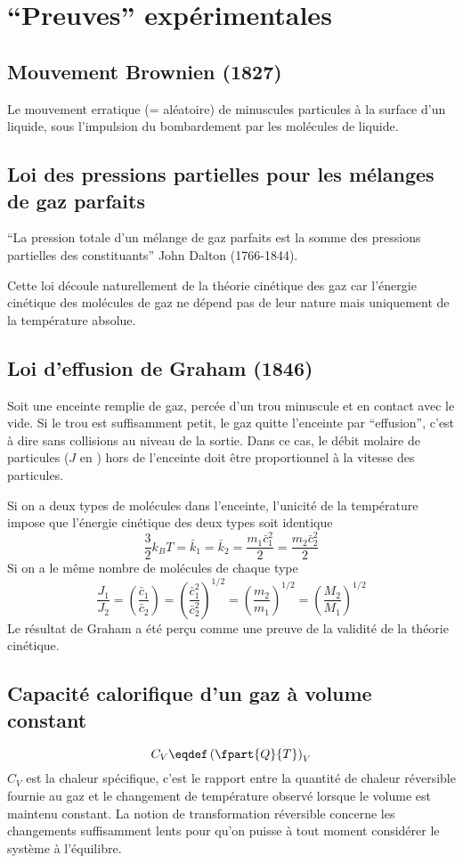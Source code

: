 \section{``Preuves'' expérimentales}
\subsection{Mouvement Brownien (1827)}
Le mouvement erratique (= aléatoire) de minuscules particules à la surface d'un liquide,
sous l'impulsion du bombardement par les molécules de liquide.

\subsection{Loi des pressions partielles pour les mélanges de gaz parfaits}
``La pression totale d'un mélange de gaz parfaits est
la somme des pressions partielles des constituants'' John Dalton (1766-1844).

Cette loi découle naturellement de la théorie cinétique des gaz car
l'énergie cinétique des molécules de gaz ne dépend pas de leur nature mais
uniquement de la température absolue.

\subsection{Loi d'effusion de Graham (1846)}
Soit une enceinte remplie de gaz, percée d'un trou minuscule et
en contact avec le vide.
Si le trou est suffisamment petit,
le gaz quitte l'enceinte par ``effusion'',
c'est à dire sans collisions au niveau de la sortie.
Dans ce cas, le débit molaire de particules ($J$ en \mole\per\second)
hors de l'enceinte doit être proportionnel à la vitesse des particules.

Si on a deux types de molécules dans l'enceinte,
l'unicité de la température impose que
l'énergie cinétique des deux types soit identique
\[ \frac 32 k_BT = \bar k_1 = \bar k_2 = \frac{m_1\bar c_1^2}{2} =
\frac{m_2\bar c_2^2}{2} \]
Si on a le même nombre de molécules de chaque type
\[ \frac{J_1}{J_2} = \left(\frac{\bar c_1}{\bar c_2}\right) =
\left(\frac{\bar c_1^2}{\bar c_2^2}\right)^{1/2} =
\left(\frac{m_2}{m_1}\right)^{1/2} =
\left(\frac{M_2}{M_1}\right)^{1/2} \]
Le résultat de Graham a été perçu comme
une preuve de la validité de la théorie cinétique.

\subsection{Capacité calorifique d'un gaz à volume constant}
\[ C_V \eqdef \left(\fpart{Q}{T} \right)_V \]
$C_V$ est la chaleur spécifique,
c'est le rapport entre la quantité de chaleur réversible fournie au gaz et
le changement de température observé lorsque le volume est maintenu constant.
La notion de transformation réversible concerne les changements suffisamment
lents pour qu'on puisse à tout moment considérer le système à l'équilibre.

